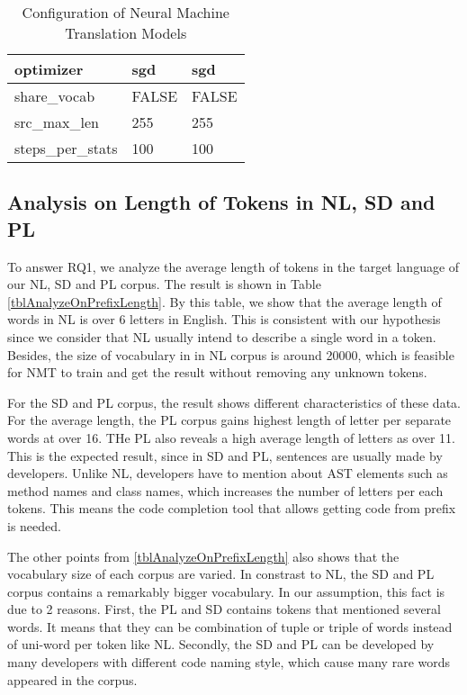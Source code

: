 \begin{table}[]
\begin{tabular}{|l|l|l|}
\\ \hline
optimizer                   & sgd                           & sgd                            \\ \hline
share\_vocab                & FALSE                         & FALSE                          \\ \hline
src\_max\_len               & 255                           & 255                            \\ \hline
steps\_per\_stats           & 100                           & 100                            \\ \hline
\end{tabular}
\caption{Configuration of Neural Machine Translation Models}
\label{tblConfigNMTs}
\end{table}



\subsection{Analysis on Length of Tokens in NL, SD and PL}
To answer RQ1, we analyze the average length of tokens in the target language of our NL, SD and PL corpus. The result is shown in Table \ref{tblAnalyzeOnPrefixLength}. By this table, we show that the average length of words in NL is over 6 letters in English. This is consistent with our hypothesis since we consider that NL usually intend to describe a single word in a token. Besides, the size of vocabulary in in NL corpus is around 20000, which is feasible for NMT to train and get the result without removing any unknown tokens.

For the SD and PL corpus, the result shows different characteristics of these data. For the average length, the PL corpus gains highest length of letter per separate words at over 16. THe PL also reveals a high average length of letters as over 11. This is the expected result, since in SD and PL, sentences are usually made by developers. Unlike NL, developers have to mention about AST elements such as method names and class names, which increases the number of letters per each tokens. This means the code completion tool that allows getting code from prefix is needed.

The other points from \ref{tblAnalyzeOnPrefixLength} also shows that the vocabulary size of each corpus are varied. In constrast to NL, the SD and PL corpus contains a remarkably bigger vocabulary. In our assumption, this fact is due to 2 reasons. First, the PL and SD contains tokens that mentioned several words. It means that they can be combination of tuple or triple of words instead of uni-word per token like NL. Secondly, the SD and PL can be developed by many developers with different code naming style, which cause many rare words appeared in the corpus.


